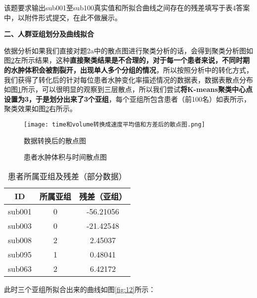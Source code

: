 \documentclass[bwprint]{gmcmthesis}
\begin{document}
				该题要求输出sub001至sub100真实值和所拟合曲线之间存在的残差填写于表4答案中，以附件形式提交，在此不做展示。
				
				\textbf{二、人群亚组划分及曲线拟合}
				
				依据分析如果我们直接对题2a中的散点图进行聚类分析的话，会得到聚类分析图如图\ref{fig:11}左所示结果，这种\textbf{直接聚类结果是不合理的，对于每一个患者来说，不同时期的水肿体积会被割裂开，出现单人多个分组的情况}，所以按照分析中的转化方式，我们获得了转化后的针对每位患者水肿变化率描述情况的数据表，数据表散点分布如图\ref{fig:10}所示，可以很明显的观察到三层散点，所以我们尝试\textbf{将K-means聚类中心点设置为3，于是划分出来了3个亚组}，每个亚组所包含患者（前100名）如表所示，聚类效果如图\ref{fig:11}右所示。
				
				\begin{figure}[H]
					\centering
					\caption{数据转换后的散点图}
					\texttt{[image: time和volume转换成速度平均值和方差后的散点图.png]}
					\label{fig:10}
				\end{figure}
				
				\begin{figure}[H]
					\centering
					\qquad
					\caption{患者水肿体积与时间散点图}
					\label{fig:11}
				\end{figure}
				
				\begin{table}[H]
					\centering
					\label{tab:10}
					\caption{患者所属亚组及残差（部分数据）}
					\setlength{\tabcolsep}{13mm}
					\begin{tabular}{|c|c|c|}
						\hline
						\rowcolor{blue!25} ID & 所属亚组 & 残差（亚组） \\ \hline
						\rowcolor{blue!5}sub001 & 0 & -56.21056\\ \hline
						\rowcolor{white!5}sub003 & 0 & -21.42548\\ \hline
						\rowcolor{blue!5}sub008 & 2 & 2.45037\\ \hline
						\rowcolor{white!5}sub095 & 1  & 0.48041 \\ \hline
						\rowcolor{blue!5}sub063 & 2  & 6.42172 \\ \hline
					\end{tabular}
				\end{table}
				
				此时三个亚组所拟合出来的曲线如图\ref{fig:12}所示：
				
\end{document}
